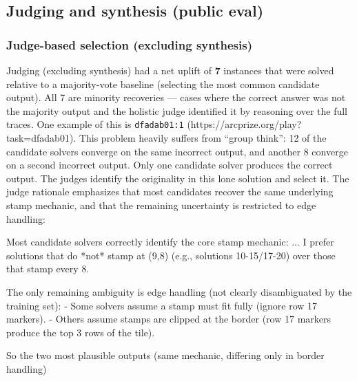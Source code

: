 \documentclass[11pt]{article}
\newenvironment{Shaded}{}{}
\newcommand{\NormalTok}[1]{#1}
\renewenvironment{Shaded}{\begin{snugshade}}{\end{snugshade}}
\begin{document}
\hypertarget{judging-and-synthesis-public-eval}{%
\subsection{Judging and synthesis (public
eval)}\label{judging-and-synthesis-public-eval}}

\hypertarget{judge-based-selection-excluding-synthesis}{%
\subsubsection{Judge-based selection (excluding
synthesis)}\label{judge-based-selection-excluding-synthesis}}

Judging (excluding synthesis) had a net uplift of \textbf{7} instances
that were solved relative to a majority-vote baseline (selecting the
most common candidate output). All 7 are minority recoveries --- cases
where the correct answer was not the majority output and the holistic
judge identified it by reasoning over the full traces. One example of
this is \texttt{dfadab01:1} (https://arcprize.org/play?task=dfadab01).
This problem heavily suffers from ``group think'': 12 of the candidate
solvers converge on the same incorrect output, and another 8 converge on
a second incorrect output. Only one candidate solver produces the
correct output. The judges identify the originality in this lone
solution and select it. The judge rationale emphasizes that most
candidates recover the same underlying stamp mechanic, and that the
remaining uncertainty is restricted to edge handling:

\begin{Shaded}
\begin{Highlighting}[]
\NormalTok{Most candidate solvers correctly identify the}
\NormalTok{core stamp mechanic:}
\NormalTok{...}
\NormalTok{I prefer solutions that do *not* stamp at (9,8)}
\NormalTok{(e.g., solutions 10{-}15/17{-}20) over those that}
\NormalTok{stamp every 8.}

\NormalTok{The only remaining ambiguity is edge handling}
\NormalTok{(not clearly disambiguated by the training set):}
\NormalTok{{-} Some solvers assume a stamp must fit fully}
\NormalTok{  (ignore row 17 markers).}
\NormalTok{{-} Others assume stamps are clipped at the border}
\NormalTok{  (row 17 markers produce the top 3 rows of}
\NormalTok{  the tile).}

\NormalTok{So the two most plausible outputs}
\NormalTok{(same mechanic, differing only in border handling)}
\end{Highlighting}
\end{Shaded}
\end{document}
